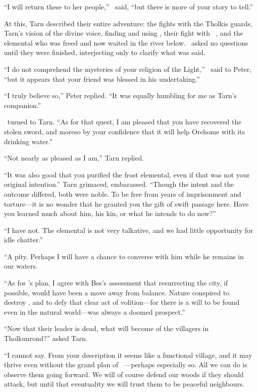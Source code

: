 ``I will return these to her people,'' \arilor\ said, ``but there is more of your story to tell.''

At this, Tarn described their entire adventure: the fights with the Tholkis guards, Tarn's vision of the divine voice, finding and using \kildir, their fight with \mothzam\ \driktur, and the elemental who was freed and now waited in the river below.  \arilor\ asked no questions until they were finished, interjecting only to clarify what was said.

``I do not comprehend the mysteries of your religion of the Light,'' \arilor\ said to Peter, ``but it appears that your friend was blessed in his undertaking.''

``I truly believe so,'' Peter replied.  ``It was equally humbling for me as Tarn's companion.''

\arilor\ turned to Tarn.  ``As for that quest, I am pleased that you have recovered the stolen sword, and moreso by your confidence that it will help Orehome with its drinking water.''

``Not nearly as pleased as I am,'' Tarn replied.

``It was also good that you purified the frost elemental, even if that was not your original intention.''  Tarn grimaced, embarassed.  ``Though the intent and the outcome differed, both were noble.  To be free from years of imprisonment and torture---it is no wonder that he granted you the gift of swift passage here.  Have you learned much about him, his kin, or what he intends to do now?''

``I have not.  The elemental is not very talkative, and we had little opportunity for idle chatter.''

``A pity.  Perhaps I will have a chance to converse with him while he remains in our waters.

``As for \mothzam's plan, I agree with Bes's assessment that resurrecting the city, if possible, would have been a move away from balance.  Nature conspired to destroy \atmudarant, and to defy that clear act of volition---for there is a will to be found even in the natural world---was always a doomed prospect.''

``Now that their leader is dead, what will become of the villagers in Tholkunrond?'' asked Tarn.

``I cannot say.  From your description it seems like a functional village, and it may thrive even without the grand plan of \mothzam\ \driktur---perhaps especially so.  All we can do is observe them going forward.  We will of course defend our woods if they should attack, but until that eventuality we will trust them to be peaceful neighbours.

